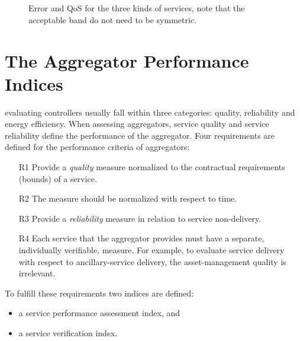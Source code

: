 \begin{figure}[htpb!]
\centering
{} \\
\\
\caption{Error and QoS for the three kinds of services, note that the acceptable band do not need to be symmetric.}
\label{fig:MAINerrorQoS}
\end{figure}

\section{The Aggregator Performance Indices}
 evaluating controllers usually fall within three categories: quality, reliability and energy efficiency. When assessing aggregators, service quality and service reliability define the performance of the aggregator. Four requirements are defined for the performance criteria of aggregators:
\begin{itemize}
	\item[R1] Provide a \emph{quality} measure normalized to the contractual requirements (bounds) of a service. 
	\item[R2] The measure should be normalized with respect to time.
	\item[R3] Provide a \emph{reliability} measure in relation to service non-delivery.
	\item[R4] Each service that the aggregator provides must have a separate, individually verifiable, measure. For example, to evaluate service delivery with respect to ancillary-service delivery, the asset-management quality is irrelevant.
\end{itemize}

To fulfill these requirements two indices are defined:
\begin{itemize}
	\item a service performance assessment index, and
	\item a service verification index.
\end{itemize}

